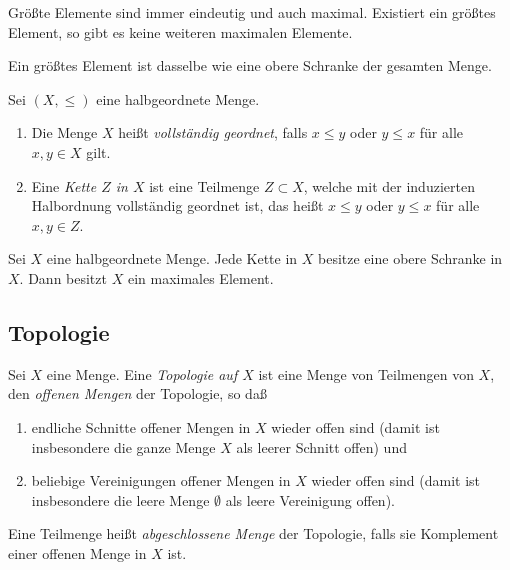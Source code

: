 \begin{remark}
	Größte Elemente sind immer eindeutig und auch maximal. Existiert ein größtes Element, so gibt es keine weiteren maximalen
	Elemente.
	
	Ein größtes Element ist dasselbe wie eine obere Schranke der gesamten Menge.
\end{remark}

\begin{definition}
	Sei \((X, \le)\) eine halbgeordnete Menge.
	\begin{enumerate}
	\item
		Die Menge \(X\) heißt \emph{vollständig geordnet}, falls \(x \le y\) oder \(y \le x\) für alle \(x, y \in X\) gilt.
	\item
		Eine \emph{Kette \(Z\) in \(X\)} ist eine Teilmenge \(Z \subset X\), welche mit der induzierten Halbordnung vollständig
		geordnet ist, das heißt \(x \le y\) oder \(y \le x\) für alle \(x, y \in Z\).
	\end{enumerate}
\end{definition}

\begin{theorem}
	Sei \(X\) eine halbgeordnete Menge. Jede Kette in \(X\) besitze eine obere Schranke in \(X\). Dann besitzt \(X\) ein
	maximales Element.
\end{theorem}

\subsection{Topologie}

\begin{definition}
		Sei \(X\) eine Menge. Eine \emph{Topologie auf \(X\)} ist eine Menge von
		Teilmengen von \(X\), den \emph{offenen Mengen} der Topologie, so daß
		\begin{enumerate}
		\item
			endliche Schnitte offener Mengen in \(X\) wieder offen sind (damit ist insbesondere die ganze Menge \(X\) als
			leerer Schnitt offen) und
		\item
			beliebige Vereinigungen offener Mengen in \(X\) wieder offen sind (damit ist insbesondere die leere Menge
			\(\emptyset\) als leere Vereinigung offen).
		\end{enumerate}
		Eine Teilmenge heißt \emph{abgeschlossene Menge} der Topologie, falls sie Komplement einer 
		offenen Menge in \(X\) ist.
\end{definition}

